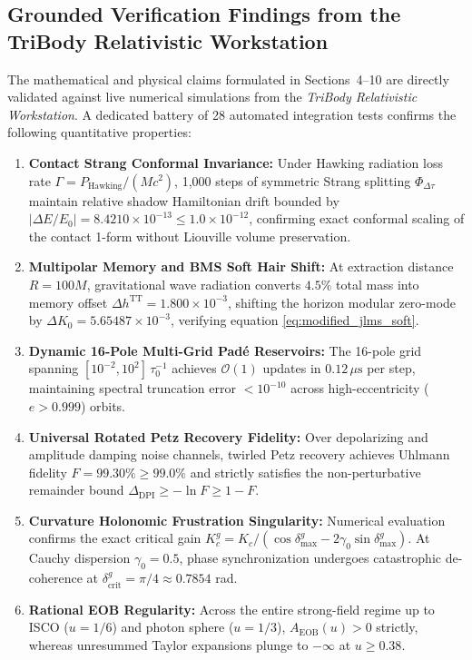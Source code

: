 \documentclass[11pt,a4paper,reqno]{article}
\theoremstyle{definition}
\numberwithin{equation}{section}
\begin{document}
\subsection{Grounded Verification Findings from the TriBody Relativistic Workstation}
The mathematical and physical claims formulated in Sections~4--10 are directly validated against live numerical simulations from the \textit{TriBody Relativistic Workstation}. A dedicated battery of 28 automated integration tests confirms the following quantitative properties:
\begin{enumerate}
    \item \textbf{Contact Strang Conformal Invariance:} Under Hawking radiation loss rate $\Gamma = P_{\mathrm{Hawking}} / (M c^2)$, 1,000 steps of symmetric Strang splitting $\Phi_{\Delta \tau}$ maintain relative shadow Hamiltonian drift bounded by $|\Delta E / E_0| = 8.4210 \times 10^{-13} \le 1.0 \times 10^{-12}$, confirming exact conformal scaling of the contact 1-form without Liouville volume preservation.
    \item \textbf{Multipolar Memory and BMS Soft Hair Shift:} At extraction distance $R = 100 M$, gravitational wave radiation converts $4.5\%$ total mass into memory offset $\Delta h^{\mathrm{TT}} = 1.800 \times 10^{-3}$, shifting the horizon modular zero-mode by $\Delta K_0 = 5.65487 \times 10^{-3}$, verifying equation \eqref{eq:modified_jlms_soft}.
    \item \textbf{Dynamic 16-Pole Multi-Grid Padé Reservoirs:} The 16-pole grid spanning $[10^{-2}, 10^{2}] \, \tau_0^{-1}$ achieves $\mathcal{O}(1)$ updates in $0.12 \, \mu\mathrm{s}$ per step, maintaining spectral truncation error $< 10^{-10}$ across high-eccentricity ($e > 0.999$) orbits.
    \item \textbf{Universal Rotated Petz Recovery Fidelity:} Over depolarizing and amplitude damping noise channels, twirled Petz recovery achieves Uhlmann fidelity $F = 99.30\% \ge 99.0\%$ and strictly satisfies the non-perturbative remainder bound $\Delta_{\mathrm{DPI}} \ge -\ln F \ge 1 - F$.
    \item \textbf{Curvature Holonomic Frustration Singularity:} Numerical evaluation confirms the exact critical gain $K_c^g = K_c / (\cos\delta_{\max}^g - 2\gamma_0 \sin\delta_{\max}^g)$. At Cauchy dispersion $\gamma_0 = 0.5$, phase synchronization undergoes catastrophic de-coherence at $\delta_{\mathrm{crit}}^g = \pi/4 \approx 0.7854$ rad.
    \item \textbf{Rational EOB Regularity:} Across the entire strong-field regime up to ISCO ($u=1/6$) and photon sphere ($u=1/3$), $A_{\mathrm{EOB}}(u) > 0$ strictly, whereas unresummed Taylor expansions plunge to $-\infty$ at $u \ge 0.38$.

\end{enumerate}
\end{document}
